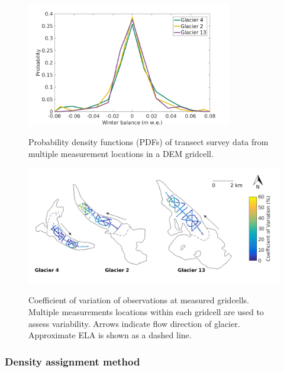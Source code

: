 \documentclass{sfuthesis}
\begin{document}
\begin{figure}[H]
	\centering
	\includegraphics[width =0.8\textwidth]{SWEvarMeasureLocHIST.png}\\
	\caption{Probability density functions (PDFs) of transect survey data from multiple measurement locations in a DEM gridcell.}
	\label{fig:SWEvar_MultLoc_hist}
\end{figure}

\begin{figure}[H]
	\centering
	\includegraphics[width =\textwidth]{Map_cellstd_measureLoc.png}\\
	\caption[Coefficient of variation of observations at measured gridcells]{Coefficient of variation of observations at measured gridcells. Multiple measurements locations within each gridcell are used to assess variability. Arrows indicate flow direction of glacier. Approximate ELA is shown as a dashed line.}
	\label{fig:SWEvar_MultLoc_map}
\end{figure}



\subsubsection{Density assignment method}
\end{document}
